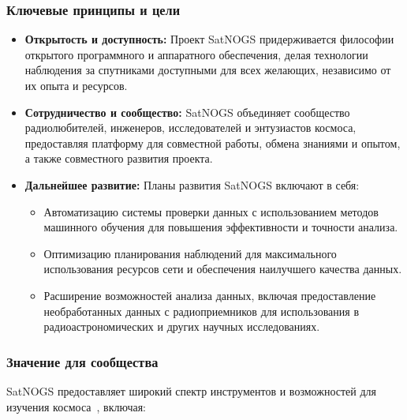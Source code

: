 \documentclass[14pt, a4paper]{extreport}
\begin{document}
    \subsubsection{Ключевые принципы и цели}

    \begin{itemize}
        \item \textbf{Открытость и доступность:} Проект SatNOGS придерживается философии открытого программного и аппаратного обеспечения, делая технологии наблюдения за спутниками доступными для всех желающих, независимо от их опыта и ресурсов.
        \item \textbf{Сотрудничество и сообщество:} SatNOGS объединяет сообщество радиолюбителей, инженеров, исследователей и энтузиастов космоса, предоставляя платформу для совместной работы, обмена знаниями и опытом,  а также совместного развития проекта.
        \item \textbf{Дальнейшее развитие:} Планы развития SatNOGS включают в себя:
        \begin{itemize}
            \item Автоматизацию системы проверки данных с использованием методов машинного обучения для повышения эффективности и точности анализа.
            \item Оптимизацию планирования наблюдений для максимального использования ресурсов сети и обеспечения наилучшего качества данных.
            \item Расширение возможностей анализа данных, включая предоставление необработанных данных с радиоприемников для использования в радиоастрономических и других научных исследованиях.
        \end{itemize}
    \end{itemize}

    \subsubsection{Значение для сообщества}

    SatNOGS предоставляет широкий спектр инструментов и возможностей для изучения космоса~\cite{satnogs_general_docs},  включая:
\end{document}
